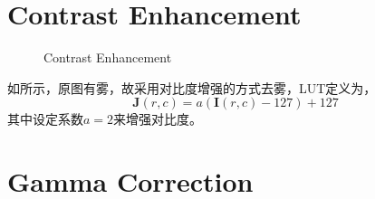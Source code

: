 \documentclass[12pt,a4paper]{article}
\begin{document}
\section{Contrast Enhancement}

\begin{figure}[H]
    \centering
    \caption{Contrast Enhancement}
    \label{fig:contrast}
\end{figure}

如所示，原图有雾，故采用对比度增强的方式去雾，LUT定义为，
\begin{equation}
    \boldsymbol{J}(r, c) = a \left(\boldsymbol{I}(r, c) - 127\right) + 127
\end{equation}
其中设定系数$a=2$来增强对比度。

\section{Gamma Correction}
\end{document}
